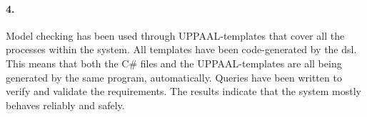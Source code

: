 \paragraph{4.} Model checking has been used through UPPAAL-templates that cover all the processes within the system. All templates have been code-generated by the \acrshort{dsl}. This means that both the C\# files and the UPPAAL-templates are all being generated by the same program, automatically. Queries have been written to verify and validate the requirements. The results indicate that the system mostly behaves reliably and safely.\\

